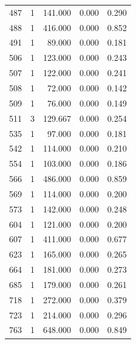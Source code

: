 \begin{table}
\begin{tabular}{rrrrr}
 487 &      1 &        141.000 &        0.000 &           0.290 \\
 488 &      1 &        416.000 &        0.000 &           0.852 \\
 491 &      1 &         89.000 &        0.000 &           0.181 \\
 506 &      1 &        123.000 &        0.000 &           0.243 \\
 507 &      1 &        122.000 &        0.000 &           0.241 \\
 508 &      1 &         72.000 &        0.000 &           0.142 \\
 509 &      1 &         76.000 &        0.000 &           0.149 \\
 511 &      3 &        129.667 &        0.000 &           0.254 \\
 535 &      1 &         97.000 &        0.000 &           0.181 \\
 542 &      1 &        114.000 &        0.000 &           0.210 \\
 554 &      1 &        103.000 &        0.000 &           0.186 \\
 566 &      1 &        486.000 &        0.000 &           0.859 \\
 569 &      1 &        114.000 &        0.000 &           0.200 \\
 573 &      1 &        142.000 &        0.000 &           0.248 \\
 604 &      1 &        121.000 &        0.000 &           0.200 \\
 607 &      1 &        411.000 &        0.000 &           0.677 \\
 623 &      1 &        165.000 &        0.000 &           0.265 \\
 664 &      1 &        181.000 &        0.000 &           0.273 \\
 685 &      1 &        179.000 &        0.000 &           0.261 \\
 718 &      1 &        272.000 &        0.000 &           0.379 \\
 723 &      1 &        214.000 &        0.000 &           0.296 \\
 763 &      1 &        648.000 &        0.000 &           0.849 \\
\bottomrule
\end{tabular}
\end{table}
